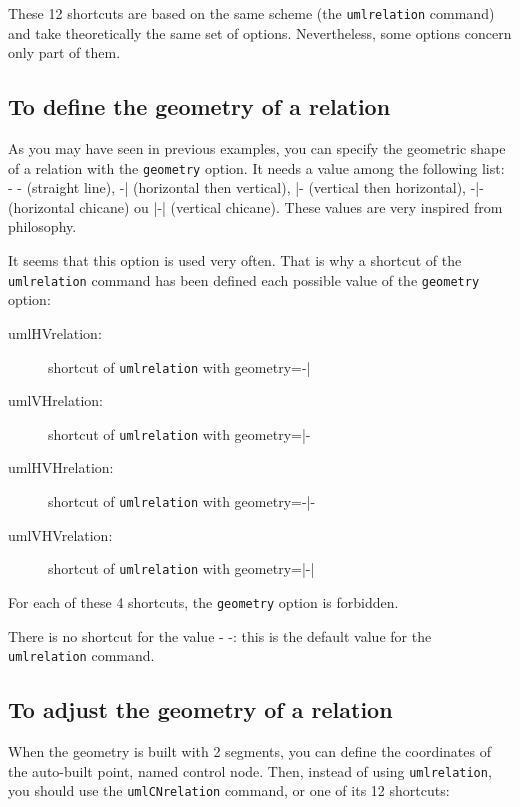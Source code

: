\documentclass[a4paper,11pt]{report}
\begin{document}
These 12 shortcuts are based on the same scheme (the {\tt umlrelation} command) and take theoretically the same set of options. Nevertheless, some options concern only part of them.

\subsection{To define the geometry of a relation}\label{ss.relgeom}

As you may have seen in previous examples, you can specify the geometric shape of a relation
with the \hypertarget{geometry}{{\tt geometry}} option. It needs a value among the following list: - - (straight line), -| (horizontal then vertical), |- (vertical then horizontal), -|- (horizontal chicane) ou |-| (vertical chicane). These values are very inspired from \TikZ philosophy.

It seems that this option is used very often. That is why a shortcut of the {\tt umlrelation} command has been defined each possible value of the {\tt geometry} option:

\begin{description}
\item[umlHVrelation:] shortcut of {\tt umlrelation} with geometry=-|
\item[umlVHrelation:] shortcut of {\tt umlrelation} with geometry=|-
\item[umlHVHrelation:] shortcut of {\tt umlrelation} with geometry=-|-
\item[umlVHVrelation:] shortcut of {\tt umlrelation} with geometry=|-|
\end{description}

\begin{remark}
For each of these 4 shortcuts, the {\tt geometry} option is forbidden.
\end{remark}

\begin{remark}
There is no shortcut for the value - -: this is the default value for the {\tt umlrelation} command.
\end{remark}

\subsection{To adjust the geometry of a relation}\label{ss.relfitgeom}

When the geometry is built with 2 segments, you can define the coordinates of the auto-built point, named control node. 
Then, instead of using {\tt umlrelation}, you should use the {\tt umlCNrelation} command, or one of its 12 shortcuts:
\end{document}

